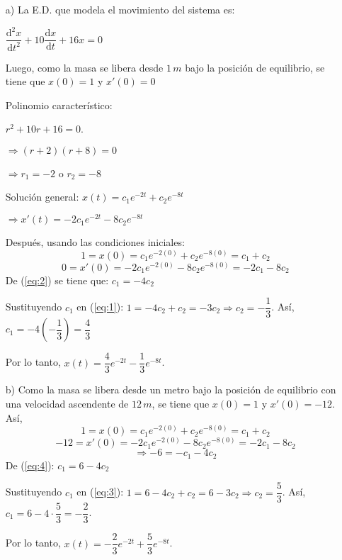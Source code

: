 \documentclass[fleqn]{article}
\begin{document}
    \begin{enumerate}
        \item[a)] La E.D. que modela el movimiento del sistema es:
        
        $ \dfrac{\mathrm{d}^2 x}{\mathrm{d} t^2} + 10 \dfrac{\mathrm{d} x}{\mathrm{d} t} + 16x = 0 $

        Luego, como la masa se libera desde $ 1 \, m $ bajo la posición de equilibrio, se tiene que $ x(0) = 1 $ y $ x'(0) = 0 $

        Polinomio característico: 
        
        $ r^2 + 10r + 16 = 0 $.

        $ \Longrightarrow (r + 2)(r + 8) = 0 $

        $ \Longrightarrow r_1 = -2 $ o $ r_2 = -8 $

        Solución general: $ x(t) = c_1 e^{-2t} + c_2 e^{-8t} $

        $ \Longrightarrow x'(t) = -2c_1 e^{-2t} - 8c_2 e^{-8t} $

        Después, usando las condiciones iniciales:
        \begin{equation}
            \label{eq:1}
            1 = x(0) = c_1 e^{-2(0)} + c_2 e^{-8(0)} = c_1 + c_2
        \end{equation}
        \begin{equation}
            \label{eq:2}
            0 = x'(0) = -2c_1 e^{-2(0)} - 8c_2 e^{-8(0)} = - 2c_1 - 8c_2
        \end{equation}
        De (\ref{eq:2}) se tiene que: $ c_1 = - 4c_2 $
        
        Sustituyendo $ c_1 $ en (\ref{eq:1}): $ 1 = - 4c_2 + c_2 = - 3c_2 \Longrightarrow c_2 = - \dfrac{1}{3} $. Así, $ c_1 = - 4 \left(- \dfrac{1}{3} \right) = \dfrac{4}{3} $

        Por lo tanto, $ x(t) = \dfrac{4}{3} e^{-2t} - \dfrac{1}{3} e^{-8t} $.

        \item[b)] Como la masa se libera desde un metro bajo la posición de equilibrio con una velocidad ascendente de $ 12 \, m $, se tiene que $ x(0) = 1 $ y $ x'(0) = - 12 $. Así,
        \begin{equation}
            \label{eq:3}
            1 = x(0) = c_1 e^{-2(0)} + c_2 e^{-8(0)} = c_1 + c_2
        \end{equation}
        \begin{equation*}
            - 12 = x'(0) = -2c_1 e^{-2(0)} - 8c_2 e^{-8(0)} = - 2c_1 - 8c_2
        \end{equation*}
        \begin{equation}
            \label{eq:4}
            \Longrightarrow - 6 = - c_1 - 4c_2
        \end{equation}
        De (\ref{eq:4}): $ c_1 = 6 - 4c_2 $

        Sustituyendo $ c_1 $ en (\ref{eq:3}): $ 1 = 6 - 4c_2 + c_2 = 6 - 3c_2 \Longrightarrow c_2 = \dfrac{5}{3} $. Así, $ c_1 = 6 - 4 \cdot \dfrac{5}{3} = - \dfrac{2}{3} $.

        Por lo tanto, $ x(t) = - \dfrac{2}{3} e^{-2t} + \dfrac{5}{3} e^{-8t} $.
    \end{enumerate}
\end{document}
